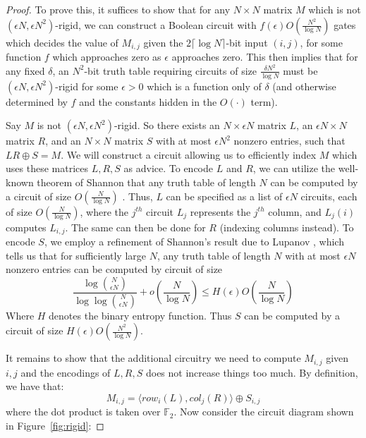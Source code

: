 \begin{proof}
To prove this, it suffices to show that for any $N \times N$ matrix $M$ which is not $(\epsilon N, \epsilon N^2)$-rigid, we can construct a Boolean circuit with $f(\epsilon)O(\frac{N^2}{\log N})$ gates which decides the value of $M_{i,j}$ given the $2\lceil \log N \rceil$-bit input $(i,j)$, for some function $f$ which approaches zero as $\epsilon$ approaches zero. This then implies that for any fixed $\delta$, an $N^2$-bit truth table requiring circuits of size $\frac{\delta N^2}{\log N}$ must be $(\epsilon N, \epsilon N^2)$-rigid  for some $\epsilon > 0$ which is a function only of $\delta$ (and otherwise determined by $f$ and the constants hidden in the $O(\cdot)$ term).

Say $M$ is not $(\epsilon N, \epsilon N^2)$-rigid. So there exists an $N \times \epsilon N$ matrix $L$, an $\epsilon N \times N$ matrix $R$, and an $N \times N$ matrix $S$ with at most $\epsilon N^2$ nonzero entries, such that $LR \oplus S = M$. We will construct a circuit allowing us to efficiently index $M$ which uses these matrices $L, R, S$ as advice. To encode $L$ and $R$, we can utilize the well-known theorem of Shannon that any truth table of length $N$ can be computed by a circuit of size $O(\frac{N}{\log N})$ \cite{Shannon}. Thus, $L$ can be specified as a list of $\epsilon N$ circuits, each of size $O(\frac{N}{\log N})$, where the $j^{th}$ circuit $L_j$ represents the $j^{th}$ column, and $L_j(i)$ computes $L_{i,j}$. The same can then be done for $R$ (indexing columns instead). To encode $S$, we employ a refinement of Shannon's result due to Lupanov \cite{Coin-Problem}, which tells us that for sufficiently large $N$, any truth table of length $N$ with at most $\epsilon N$ nonzero entries can be computed by circuit of size
\[
\frac{\log\binom{N}{\epsilon N}}{\log \log \binom{N}{\epsilon N}} + o\left(\frac{N}{\log N}\right) \leq H(\epsilon) O(\frac{N}{\log N})
\]
Where $H$ denotes the binary entropy function. Thus $S$ can be computed by a circuit of size $H(\epsilon) O(\frac{N^2}{\log N})$.

It remains to show that the additional circuitry we need to compute $M_{i,j}$ given $i, j$ and the encodings of $L,R,S$ does not increase things too much. By definition, we have that:
\[M_{i,j} = \langle row_i(L), col_j(R) \rangle \oplus S_{i,j}\]
where the dot product is taken over $\mathbb{F}_2$. Now consider the circuit diagram shown in Figure~\ref{fig:rigid}:


\end{proof}
